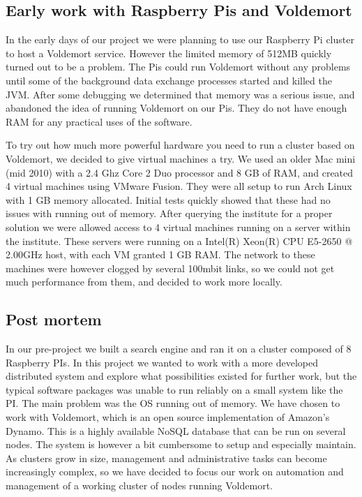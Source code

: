\subsection{Early work with Raspberry Pis and Voldemort}
In the early days of our project we were planning to use our Raspberry Pi cluster to host a Voldemort service. However the limited memory of 512MB quickly turned out to be a problem. The Pis could run Voldemort without any problems until some of the background data exchange processes started and killed the JVM. After some debugging we determined that memory was a serious issue, and abandoned the idea of running Voldemort on our Pis. They do not have enough RAM for any practical uses of the software.

To try out how much more powerful hardware you need to run a cluster based on Voldemort, we decided to give virtual machines a try. We used an older Mac mini (mid 2010) with a 2.4 Ghz Core 2 Duo processor and 8 GB of RAM, and created 4 virtual machines using VMware Fusion. They were all setup to run Arch Linux with 1 GB memory allocated. Initial tests quickly showed that these had no issues with running out of memory. After querying the institute for a proper solution we were allowed access to 4 virtual machines running on a server within the institute. These servers were running on a Intel(R) Xeon(R) CPU E5-2650 @ 2.00GHz host, with each VM granted 1 GB RAM. The network to these machines were however clogged by several 100mbit links, so we could not get much performance from them, and decided to work more locally.

\subsection{Post mortem}
In our pre-project we built a search engine and ran it on a cluster composed of 8 Raspberry PIs. In this project we wanted to work with a more developed distributed system and explore what possibilities existed for further work, but the typical software packages was unable to run reliably on a small system like the PI. The main problem was the OS running out of memory.
We have chosen to work with Voldemort, which is an open source implementation of Amazon’s Dynamo. This is a highly available NoSQL database that can be run on several nodes. The system is however a bit cumbersome to setup and especially maintain.
As clusters grow in size, management and administrative tasks can become increasingly complex, so we have decided to focus our work on automation and management of a working cluster of nodes running Voldemort. 
